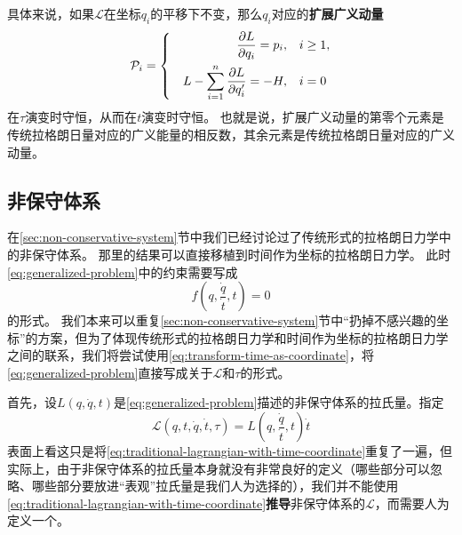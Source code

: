 \documentclass[UTF8, a4paper]{ctexart}
\newenvironment{bigcase}{\left\{\quad\begin{aligned}}{\end{aligned}\right.}
\begin{document}
具体来说，如果$\mathcal{L}$在坐标$q_i$的平移下不变，那么$q_i$对应的\textbf{扩展广义动量}
\begin{equation}
    \mathcal{P}_i = \begin{bigcase}
        \pdv{L}{q_i} = p_i, \quad &i \geq 1, \\
        L - \sum_{i=1}^n \pdv{L}{q_i'} = -H, \quad &i = 0
    \end{bigcase}
\end{equation}
在$\tau$演变时守恒，从而在$t$演变时守恒。
也就是说，扩展广义动量的第零个元素是传统拉格朗日量对应的广义能量的相反数，其余元素是传统拉格朗日量对应的广义动量。

\subsection{非保守体系}

在\ref{sec:non-conservative-system}节中我们已经讨论过了传统形式的拉格朗日力学中的非保守体系。
那里的结果可以直接移植到时间作为坐标的拉格朗日力学。
此时\eqref{eq:generalized-problem}中的约束需要写成
\[
    f\left(q, \frac{\dot{q}}{\dot{t}}, t\right)=0
\]
的形式。
我们本来可以重复\ref{sec:non-conservative-system}节中“扔掉不感兴趣的坐标”的方案，但为了体现传统形式的拉格朗日力学和时间作为坐标的拉格朗日力学之间的联系，我们将尝试使用\ref{eq:transform-time-as-coordinate}，将\eqref{eq:generalized-problem}直接写成关于$\mathcal{L}$和$\mathcal{\tau}$的形式。

首先，设$L(q, \dot{q}, t)$是\eqref{eq:generalized-problem}描述的非保守体系的拉氏量。指定
\[
    \mathcal{L}(q, t, \dot{q}, \dot{t}, \tau) = L\left(q, \frac{\dot{q}}{\dot{t}}, t\right) \dot{t}
\]
表面上看这只是将\eqref{eq:traditional-lagrangian-with-time-coordinate}重复了一遍，但实际上，由于非保守体系的拉氏量本身就没有非常良好的定义（哪些部分可以忽略、哪些部分要放进“表观”拉氏量是我们人为选择的），我们并不能使用\eqref{eq:traditional-lagrangian-with-time-coordinate}\textbf{推导}非保守体系的$\mathcal{L}$，而需要人为定义一个。
\end{document}
